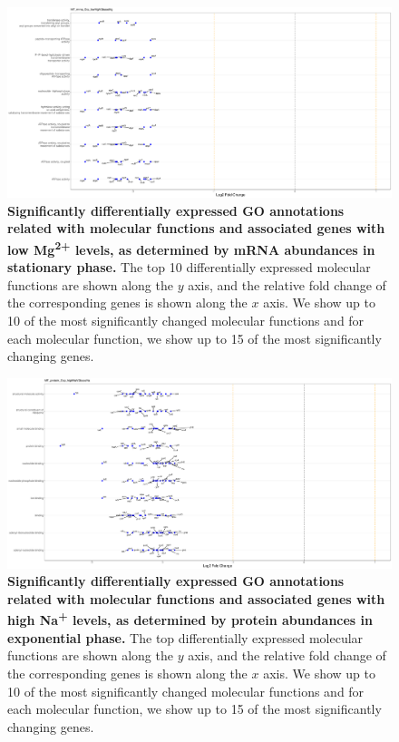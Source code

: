 \documentclass[a4paper]{article}
\begin{document}
\begin{figure}[!htb]
	\includegraphics[width=1.0\textwidth]{../../d_figures/MF13_mrna_Sta_lowMgVSbaseMg_withTitle.pdf}
	\caption[Significantly differentially expressed GO annotations associated with molecular functions for mRNA samples in stationary phase tested for low Mg\textsuperscript{2+} levels against base Mg\textsuperscript{2+} levels]
	{\textbf{Significantly differentially expressed GO annotations related with molecular functions and associated genes with low Mg\textsuperscript{2+} levels, as determined by mRNA abundances in stationary phase.} The top 10 differentially expressed molecular functions are shown along the $y$ axis, and the relative fold change of the corresponding genes is shown along the $x$ axis. We show up to 10 of the most significantly changed molecular functions and for each molecular function, we show up to 15 of the most significantly changing genes.}
\end{figure}

\begin{figure}[!htb]
	\includegraphics[width=1.0\textwidth]{../../d_figures/MF14_protein_Exp_highNaVSbaseNa_withTitle.pdf}
	\caption[Significantly differentially expressed GO annotations associated with molecular functions for protein samples in exponential phase tested for high Na\textsuperscript{+} levels against base Na\textsuperscript{+} levels]
	{\textbf{Significantly differentially expressed GO annotations related with molecular functions and associated genes with high Na\textsuperscript{+} levels, as determined by protein abundances in exponential phase.} The top differentially expressed molecular functions are shown along the $y$ axis, and the relative fold change of the corresponding genes is shown along the $x$ axis. We show up to 10 of the most significantly changed molecular functions and for each molecular function, we show up to 15 of the most significantly changing genes.}
\end{figure}
\end{document}
